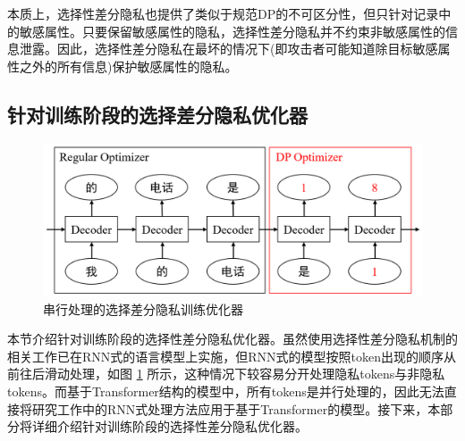 本质上，选择性差分隐私也提供了类似于规范DP的不可区分性，但只针对记录中的敏感属性。只要保留敏感属性的隐私，选择性差分隐私并不约束非敏感属性的信息泄露。因此，选择性差分隐私在最坏的情况下(即攻击者可能知道除目标敏感属性之外的所有信息)保护敏感属性的隐私。

\subsection{针对训练阶段的选择差分隐私优化器}



\begin{figure}[h]
	\centering
	\includegraphics[width=0.7\linewidth]{figures/SDP_Optim.png}
	\caption{串行处理的选择差分隐私训练优化器}
	\label{SDP_Optim}
\end{figure}

本节介绍针对训练阶段的选择性差分隐私优化器。虽然使用选择性差分隐私机制的相关工作\cite{selectivedp}已在RNN式的语言模型上实施，但RNN式的模型按照token出现的顺序从前往后滑动处理，如图 \ref{SDP_Optim} 所示，这种情况下较容易分开处理隐私tokens与非隐私tokens。而基于Transformer结构的模型中，所有tokens是并行处理的，因此无法直接将研究工作\cite{selectivedp}中的RNN式处理方法应用于基于Transformer的模型。接下来，本部分将详细介绍针对训练阶段的选择性差分隐私优化器。



